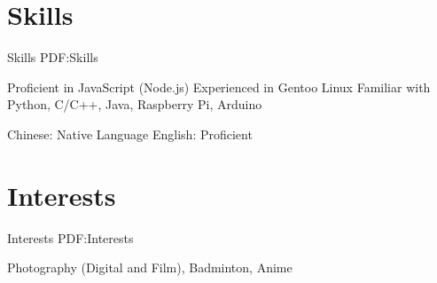 \documentclass[a4paper,MMMyyyy,nonstop]{simpleresumecv}
\begin{document}
\begin{body}

\section
{Skills}
{Skills}
{PDF:Skills}

\BulletItem
Proficient in JavaScript (Node.js)
\BulletItem
Experienced in Gentoo Linux
\BulletItem
Familiar with Python, C/C++, Java, Raspberry Pi, Arduino

\BulletItem
Chinese: Native Language
\BulletItem
English: Proficient


\section
{Interests}
{Interests}
{PDF:Interests}

Photography (Digital and Film), Badminton, Anime

\end{body}
\end{document}
